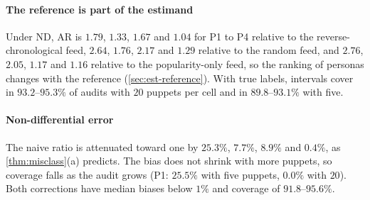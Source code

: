 \begin{table}[!tb]
\centering
\caption{Synthetic data, E1: amplification ratio relative to the reverse-chronological reference, with $20$ puppets per persona--arm cell ($R=1{,}000$; validation of $500$ impressions per arm). Truth: $\mathrm{AR}$ of the pools; it differs between regimes because the avoid-on-flag rule uses the classifier. AR: median estimate. Bias: median relative bias (\%). Cov.: coverage of the nominal $95\%$ interval (\%; MCSE at most $1.6$). RG: Rogan--Gladen correction, error rates pooled over arms or stratified by arm. For P1 under DU the pooled correction is defined in only $421$ of $1{,}000$ audits, because the corrected reference exposure is otherwise not positive; its median is over those, and the others count as misses.}\label{tab:sim-main}
\footnotesize
\setlength{\tabcolsep}{2.8pt}
\simfit{}
\end{table}

\paragraph{The reference is part of the estimand} Under ND, $\mathrm{AR}$ is $1.79$, $1.33$, $1.67$ and $1.04$ for P1 to P4 relative to the reverse-chronological feed, $2.64$, $1.76$, $2.17$ and $1.29$ relative to the random feed, and $2.76$, $2.05$, $1.17$ and $1.16$ relative to the popularity-only feed, so the ranking of personas changes with the reference (\cref{sec:est-reference}). With true labels, intervals cover in $93.2$--$95.3\%$ of audits with $20$ puppets per cell and in $89.8$--$93.1\%$ with five.

\paragraph{Non-differential error} The naive ratio is attenuated toward one by $25.3\%$, $7.7\%$, $8.9\%$ and $0.4\%$, as \cref{thm:misclass}(a) predicts. The bias does not shrink with more puppets, so coverage falls as the audit grows (P1: $25.5\%$ with five puppets, $0.0\%$ with $20$). Both corrections have median biases below $1\%$ and coverage of $91.8$--$95.6\%$.

